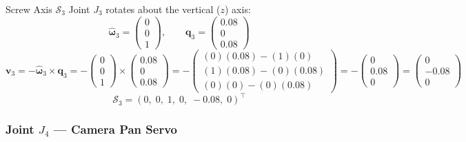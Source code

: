 \documentclass[12pt,a4paper]{article}
\newcommand{\vect}[1]{\bm{#1}}
\begin{document}
\begin{mathbox}{Screw Axis $\mathcal{S}_3$}
Joint $J_3$ rotates about the vertical ($z$) axis:
\[
  \vect{\hat\omega}_3 = \begin{pmatrix}0\\0\\1\end{pmatrix}, \qquad
  \vect{q}_3 = \begin{pmatrix}0.08\\0\\0.08\end{pmatrix}
\]
\[
  \vect{v}_3
  = -\vect{\hat\omega}_3 \times \vect{q}_3
  = -\begin{pmatrix}0\\0\\1\end{pmatrix} \times \begin{pmatrix}0.08\\0\\0.08\end{pmatrix}
  = -\begin{pmatrix}(0)(0.08)-(1)(0)\\(1)(0.08)-(0)(0.08)\\(0)(0)-(0)(0.08)\end{pmatrix}
  = -\begin{pmatrix}0\\0.08\\0\end{pmatrix}
  = \begin{pmatrix}0\\-0.08\\0\end{pmatrix}
\]
\[
  \boxed{\mathcal{S}_3 = (0,\;0,\;1,\;0,\;-0.08,\;0)^\top}
\]
\end{mathbox}

\subsubsection{Joint $J_4$ --- Camera Pan Servo}
\end{document}
